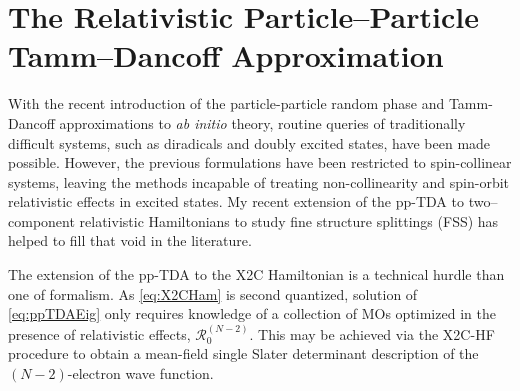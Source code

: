 \linespread{1.0}
\section{The Relativistic Particle--Particle Tamm--Dancoff Approximation}
\mylinesp
\label{sec:pp-X2C}

With the recent introduction of the particle-particle random phase and
Tamm-Dancoff approximations to \emph{ab initio} theory, routine queries of
traditionally difficult systems, such as diradicals and doubly excited states,
have been made possible. However, 
the previous formulations have been restricted to spin-collinear systems,
leaving the methods incapable of treating non-collinearity and spin-orbit
relativistic effects in excited states.  My recent extension of the pp-TDA to
two--component relativistic Hamiltonians\cite{DBWY16_Accepted1} to study fine
structure splittings (FSS) has helped to fill that void in the literature.


The extension of the pp-TDA to the X2C Hamiltonian is a technical hurdle
than one of formalism. As \cref{eq:X2CHam} is second quantized, solution of
\cref{eq:ppTDAEig} only requires knowledge of a collection of MOs optimized in
the presence of relativistic effects,
$\mathcal{R}_0^{(N-2)}$. This may be achieved via the X2C-HF procedure to obtain
a mean-field single Slater determinant description of the $(N-2)$-electron wave
function.

